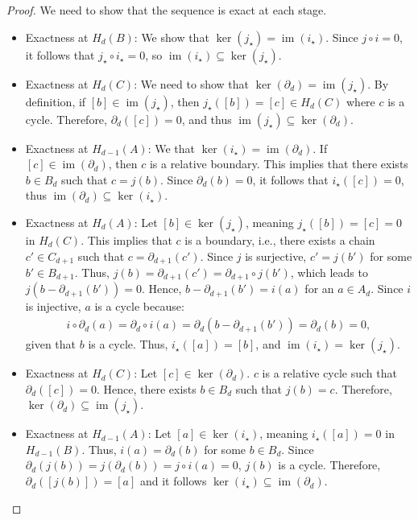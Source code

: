 \begin{proof}
	We need to show that the sequence is exact at each stage. 
	\begin{itemize}
		\item Exactness at \(H_{d}(B)\): We show that \(\ker(j_\star) = \operatorname{im}(i_\star)\). Since \(j \circ i = 0\), it follows that \(j_\star \circ i_\star = 0\), so \(\operatorname{im}(i_\star) \subseteq \ker(j_\star)\).
		\item Exactness at \(H_{d}(C)\): We need to show that \(\ker(\partial_d) = \operatorname{im}(j_\star)\). By definition, if \([b] \in \operatorname{im}(j_\star)\), then \(j_\star([b]) = [c] \in H_{d}(C)\) where \(c\) is a cycle. Therefore, \(\partial_d([c]) = 0\), and thus \(\operatorname{im}(j_\star) \subseteq \ker(\partial_d)\).
		\item Exactness at \(H_{d-1}(A)\): We that \(\ker(i_\star) = \operatorname{im}(\partial_d)\). If \([c] \in \operatorname{im}(\partial_d)\), then \(c\) is a relative boundary. This implies that there exists \(b \in B_{d}\) such that \(c = j(b)\). Since \(\partial_d(b) = 0\), it follows that \(i_\star([c]) = 0\), thus \(\operatorname{im}(\partial_d) \subseteq \ker(i_\star)\).
		\item Exactness at \(H_{d}(A)\): Let \([b] \in \ker(j_\star)\), meaning \(j_\star([b]) = [c] = 0\) in \(H_{d}(C)\). This implies that \(c\) is a boundary, i.e., there exists a chain \(c' \in C_{d+1}\) such that \(c = \partial_{d+1}(c')\). Since \(j\) is surjective, \(c' = j(b')\) for some \(b' \in B_{d+1}\). Thus, \(j(b) = \partial_{d+1}(c') = \partial_{d+1}\circ j(b')\), which leads to $j(b - \partial_{d+1}(b')) = 0$. Hence, \(b - \partial_{d+1}(b') = i(a)\) for an \(a \in A_{d}\). Since \(i\) is injective, \(a\) is a cycle because:
		      \begin{align}
		      	i \circ \partial_{d}(a) = \partial_{d} \circ i(a) = \partial_{d}(b - \partial_{d+1}(b')) = \partial_{d}(b) = 0, 
		      \end{align}
		      given that \(b\) is a cycle. Thus, \(i_\star([a]) = [b]\), and \(\operatorname{im}(i_\star) = \ker(j_\star)\).
		\item Exactness at \(H_{d}(C)\): Let \([c] \in \ker(\partial_d)\). \(c\) is a relative cycle such that \(\partial_d([c]) = 0\). Hence, there exists \(b \in B_{d}\) such that \(j(b) = c\). Therefore, \(\ker(\partial_d) \subseteq \operatorname{im}(j_\star)\).
		\item Exactness at \(H_{d-1}(A)\): Let \([a] \in \ker(i_\star)\), meaning \(i_\star([a]) = 0\) in \(H_{d-1}(B)\). Thus, \(i(a) = \partial_d(b)\) for some \(b \in B_d\). Since \(\partial_d(j(b)) = j(\partial_d(b)) = j \circ i(a) = 0\), \(j(b)\) is a cycle. Therefore, \(\partial_d([j(b)]) = [a]\) and it follows \(\ker(i_\star) \subseteq \operatorname{im}(\partial_d)\).
	\end{itemize}
\end{proof}

